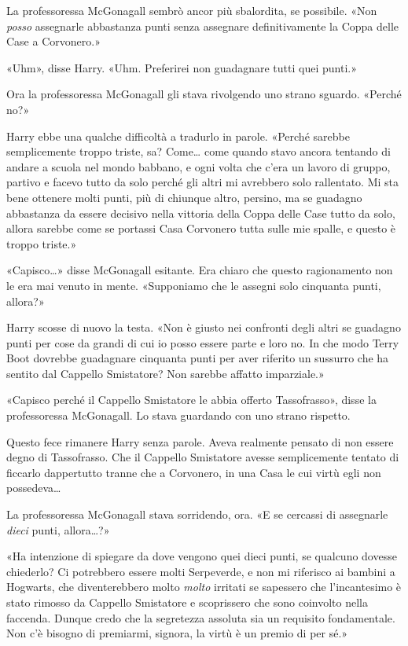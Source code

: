 La professoressa McGonagall sembrò ancor più sbalordita, se possibile. «Non \textit{posso} assegnarle abbastanza punti senza assegnare definitivamente la Coppa delle Case a Corvonero.»

«Uhm», disse Harry. «Uhm. Preferirei non guadagnare tutti quei punti.»

Ora la professoressa McGonagall gli stava rivolgendo uno strano sguardo. «Perché no?»

Harry ebbe una qualche difficoltà a tradurlo in parole. «Perché sarebbe semplicemente troppo triste, sa? Come… come quando stavo ancora tentando di andare a scuola nel mondo babbano, e ogni volta che c’era un lavoro di gruppo, partivo e facevo tutto da solo perché gli altri mi avrebbero solo rallentato. Mi sta bene ottenere molti punti, più di chiunque altro, persino, ma se guadagno abbastanza da essere decisivo nella vittoria della Coppa delle Case tutto da solo, allora sarebbe come se portassi Casa Corvonero tutta sulle mie spalle, e questo è troppo triste.»

«Capisco…» disse McGonagall esitante. Era chiaro che questo ragionamento non le era mai venuto in mente. «Supponiamo che le assegni solo cinquanta punti, allora?»

Harry scosse di nuovo la testa. «Non è giusto nei confronti degli altri se guadagno punti per cose da grandi di cui io posso essere parte e loro no. In che modo Terry Boot dovrebbe guadagnare cinquanta punti per aver riferito un sussurro che ha sentito dal Cappello Smistatore? Non sarebbe affatto imparziale.»

«Capisco perché il Cappello Smistatore le abbia offerto Tassofrasso», disse la professoressa McGonagall. Lo stava guardando con uno strano rispetto.

Questo fece rimanere Harry senza parole. Aveva realmente pensato di non essere degno di Tassofrasso. Che il Cappello Smistatore avesse semplicemente tentato di ficcarlo dappertutto tranne che a Corvonero, in una Casa le cui virtù egli non possedeva…

La professoressa McGonagall stava sorridendo, ora. «E se cercassi di assegnarle \textit{dieci} punti, allora…?»

«Ha intenzione di spiegare da dove vengono quei dieci punti, se qualcuno dovesse chiederlo? Ci potrebbero essere molti Serpeverde, e non mi riferisco ai bambini a Hogwarts, che diventerebbero molto \textit{molto} irritati se sapessero che l’incantesimo è stato rimosso da Cappello Smistatore e scoprissero che sono coinvolto nella faccenda. Dunque credo che la segretezza assoluta sia un requisito fondamentale. Non c’è bisogno di premiarmi, signora, la virtù è un premio di per sé.»


